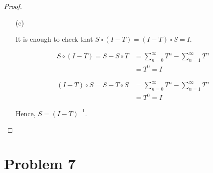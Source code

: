 \documentclass[12pt]{article}
\begin{document}
\begin{proof}
\begin{enumerate}
\item [(c)]

It is enough to check that $S\circ (I-T) = (I-T)\circ S = I$.

$$
\begin{aligned}
S\circ(I-T) = S - S\circ T & = \sum_{n=0}^\infty T^n - \sum_{n=1}^\infty T^n \\
& = T^0 = I
\end{aligned}
$$

$$
\begin{aligned}
(I-T)\circ S =  S- T\circ S  & = \sum_{n=0}^\infty T^n - \sum_{n=1}^\infty T^n \\
& = T^0 = I
\end{aligned}
$$

Hence, $S = (I -T)^{-1}$.

\end{enumerate}
\end{proof}

\section*{Problem 7}
\end{document}
